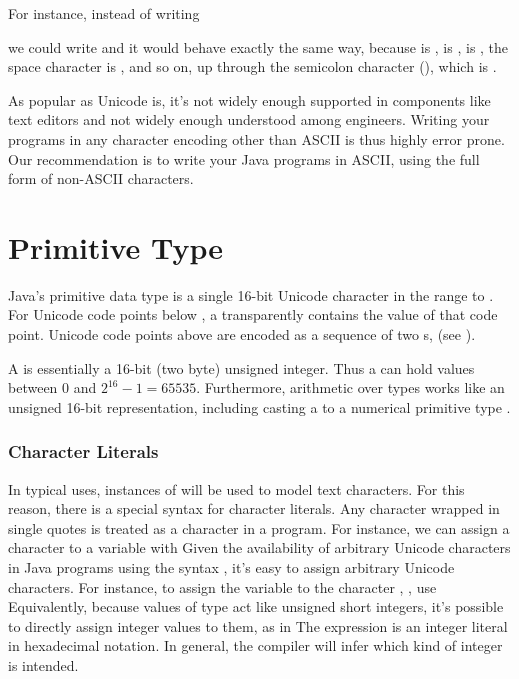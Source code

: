 For instance, instead of writing

%
we could write
%
%
and it would behave exactly the same way, because  is
,  is ,  is
, the space character is , and so on, up
through the semicolon character (\charmention{;}), which is
.

As popular as Unicode is, it's not widely enough supported in
components like text editors and not widely enough understood among
engineers.  Writing your programs in any character encoding other than
ASCII is thus highly error prone.  Our recommendation
is to write your Java programs in ASCII, using the full
 form of non-ASCII characters.


\section{ Primitive Type}\label{section:char-primitive}

Java's primitive  data type 
is a single 16-bit Unicode character in the range
 to .
For Unicode code points below , 
a  transparently contains the value of that code point.
Unicode code points above  are encoded as a 
sequence of two s, (see ).

A  is essentially a 16-bit (two
byte) unsigned integer. Thus a  can hold values between 0
and $2^16-1 = 65535$.  Furthermore, arithmetic over  types
works like an unsigned 16-bit representation, including casting a
 to a numerical primitive type .

\subsubsection{Character Literals}\label{section:character-literals}

In typical uses, instances of  will be used to model text
characters.  For this reason, there is a special syntax for character
literals.  Any character wrapped in single quotes is treated as
a character in a program.  For instance, we can assign a character
to a variable with 
%
%
Given the availability of arbitrary Unicode characters in Java
programs using the syntax , it's easy
to assign arbitrary Unicode characters.  For instance, 
to assign the variable  to the character ,
, use
%
%
Equivalently, because values of type  act like unsigned
short integers, it's possible to directly assign integer values
to them, as in
%
%
The expression  is an integer literal in hexadecimal
notation.  In general, the compiler will infer which kind of integer
is intended.  

